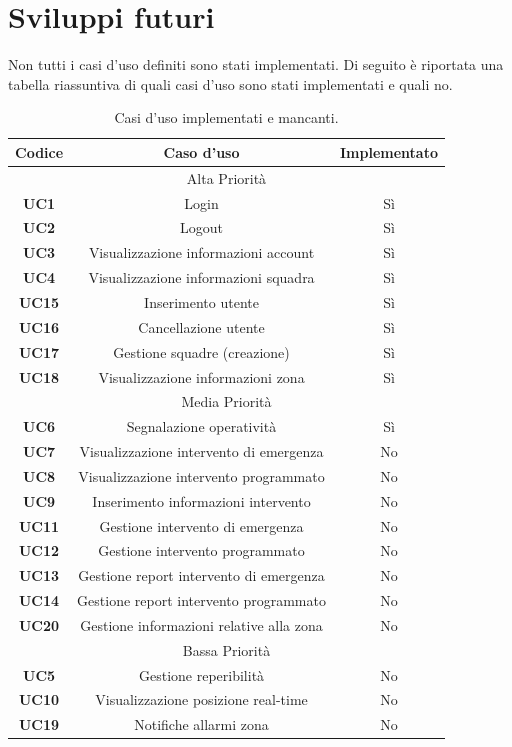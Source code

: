 \section{Sviluppi futuri}
Non tutti i casi d'uso definiti sono stati implementati. Di seguito è riportata una tabella riassuntiva di quali casi d'uso sono stati implementati e quali no.

\begin{table}[h!]
	\centering
	\begin{tabular}{|c|c|c|}
		\hline
		\textbf{Codice} & \textbf{Caso d'uso} & \textbf{Implementato} \\ \hline
		\multicolumn{3}{|c|}{Alta Priorità} \\ \hline
		\textbf{UC1} & Login & Sì\\ \hline
		\textbf{UC2} & Logout & Sì \\ \hline
		\textbf{UC3} & Visualizzazione informazioni account & Sì \\ \hline
		\textbf{UC4} & Visualizzazione informazioni squadra & Sì \\ \hline
		\textbf{UC15} & Inserimento utente & Sì \\ \hline
		\textbf{UC16} & Cancellazione utente & Sì\\ \hline
		\textbf{UC17} & Gestione squadre (creazione) & Sì \\ \hline
		\textbf{UC18} & Visualizzazione informazioni zona & Sì \\ \hline
		\multicolumn{3}{|c|}{Media Priorità} \\ \hline
		\textbf{UC6} & Segnalazione operatività & Sì\\ \hline
		\textbf{UC7} & Visualizzazione intervento di emergenza & No \\ \hline
		\textbf{UC8} & Visualizzazione intervento programmato & No \\ \hline
		\textbf{UC9} & Inserimento informazioni intervento & No \\ \hline
		\textbf{UC11} & Gestione intervento di emergenza & No \\ \hline
		\textbf{UC12} & Gestione intervento programmato & No \\ \hline
		\textbf{UC13} & Gestione report intervento di emergenza & No \\ \hline
		\textbf{UC14} & Gestione report intervento programmato & No \\ \hline
		\textbf{UC20} & Gestione informazioni relative alla zona & No \\ \hline
		\multicolumn{3}{|c|}{Bassa Priorità} \\ \hline
		\textbf{UC5} & Gestione reperibilità & No\\ \hline
		\textbf{UC10} & Visualizzazione posizione real-time & No\\ \hline
		\textbf{UC19} & Notifiche allarmi zona & No\\ \hline
	\end{tabular}
	\caption{\label{tab:table-name}Casi d'uso implementati e mancanti.}
\end{table}


